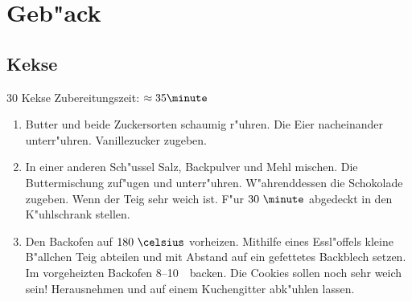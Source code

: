 \chapter{Geb"ack}
\section{Kekse}
30 Kekse \hfill Zubereitungszeit: $\approx35 \minute$

\begin{enumerate}
\item	Butter und beide Zuckersorten schaumig r"uhren.
	Die Eier nacheinander unterr"uhren.
	Vanillezucker zugeben.
\item	In einer anderen Sch"ussel Salz, Backpulver und Mehl mischen.
	Die Buttermischung zuf"ugen und unterr"uhren.
	W"ahrenddessen die Schokolade zugeben.
	Wenn der Teig sehr weich ist.
	F"ur $30~\minute$ abgedeckt in den K"uhlschrank stellen.
\item	Den Backofen auf $180~\celsius$ vorheizen.
	Mithilfe eines Essl"offels kleine B"allchen Teig abteilen und mit Abstand auf ein gefettetes Backblech setzen.
	Im vorgeheizten Backofen 8--10~\minute\ backen.
	Die Cookies sollen noch sehr weich sein!
	Herausnehmen und auf einem Kuchengitter abk"uhlen lassen.
\end{enumerate}

